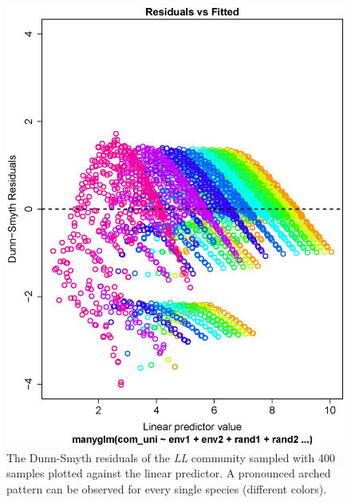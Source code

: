 \documentclass[a4paper,11pt]{article}
\begin{document}
    \begin{figure}[!htbp]
        \centering
        \includegraphics[scale = 0.4]{Arched_Dunn_Smyth}
        \caption{The Dunn-Smyth residuals of the \textit{LL} community sampled with 400 samples plotted against the linear predictor. A pronounced arched pattern can be observed for every single species (different colors).}
        \label{fig:arched_DS}
    \end{figure}{}
    
  
    
\end{document}
